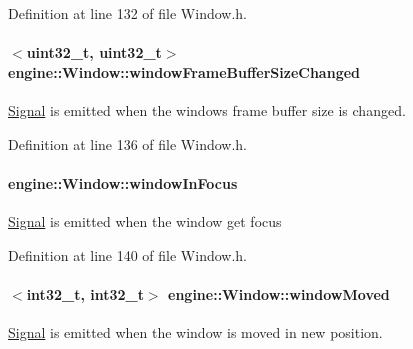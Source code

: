 Definition at line 132 of file Window.\+h.

\paragraph[{\texorpdfstring{window\+Frame\+Buffer\+Size\+Changed}{windowFrameBufferSizeChanged}}]{$<$uint32\+\_\+t, uint32\+\_\+t$>$ engine\+::\+Window\+::window\+Frame\+Buffer\+Size\+Changed\hspace{0.3cm}{\ttfamily [inherited]}}\hypertarget{a00082_a0c6ef7abcac1063c91a84123c81f9347}{}\label{a00082_a0c6ef7abcac1063c91a84123c81f9347}
\hyperlink{a00065}{Signal} is emitted when the window\textquotesingle{}s frame buffer size is changed. 

Definition at line 136 of file Window.\+h.

\paragraph[{\texorpdfstring{window\+In\+Focus}{windowInFocus}}]{ engine\+::\+Window\+::window\+In\+Focus\hspace{0.3cm}{\ttfamily [inherited]}}\hypertarget{a00082_a2a81dc83b5e8433eb39e1ca8263d0c0f}{}\label{a00082_a2a81dc83b5e8433eb39e1ca8263d0c0f}
\hyperlink{a00065}{Signal} is emitted when the window get focus 

Definition at line 140 of file Window.\+h.

\paragraph[{\texorpdfstring{window\+Moved}{windowMoved}}]{$<$int32\+\_\+t, int32\+\_\+t$>$ engine\+::\+Window\+::window\+Moved\hspace{0.3cm}{\ttfamily [inherited]}}\hypertarget{a00082_a4bdb42d789ed9587ff8f840065752506}{}\label{a00082_a4bdb42d789ed9587ff8f840065752506}
\hyperlink{a00065}{Signal} is emitted when the window is moved in new position. 

